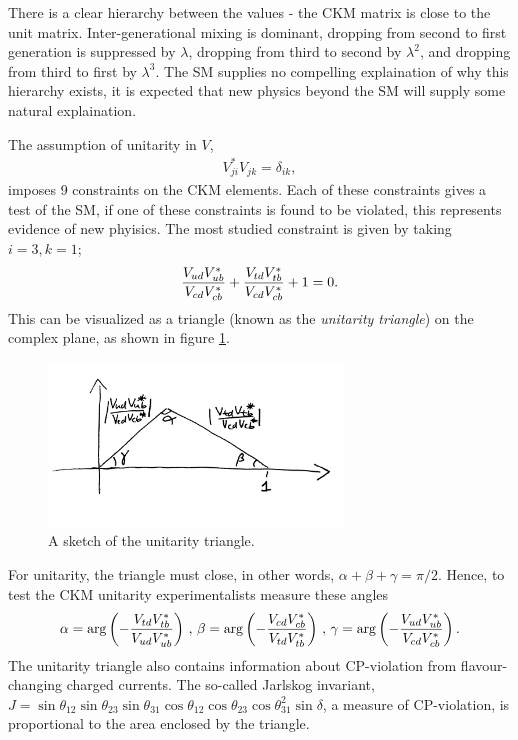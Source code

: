 There is a clear hierarchy between the values - the CKM matrix is close to the unit matrix. Inter-generational mixing is dominant, dropping from second to first generation is suppressed by $\lambda$, dropping from third to second by $\lambda^2$, and dropping from third to first by $\lambda^3$. The SM supplies no compelling explaination of why this hierarchy exists, it is expected that new physics beyond the SM will supply some natural explaination.

The assumption of unitarity in $V$,
\begin{align}
  V_{ji}^*V_{jk}=\delta_{ik},
  \label{eq:CKMunitarity}
\end{align}
imposes 9 constraints on the CKM elements. Each of these constraints gives a test of the SM, if one of these constraints is found to be violated, this represents evidence of new phyisics. The most studied constraint is given by taking $i=3,k=1$;
\begin{align}
  {V_{ud}V_{ub}^*\over V_{cd} V_{cb}^*} + {V_{td}V_{tb}^* \over V_{cd}V_{cb}^*} + 1 = 0.
\end{align}
This can be visualized as a triangle (known as the {\it{unitarity triangle}}) on the complex plane, as shown in figure \ref{fig:unitaritytriangle_sketch}.

\begin{figure}
  \vspace{-10pt}
  \begin{center}
    \includegraphics[width=0.7\textwidth]{images/unitaritytriangle_sketch.jpg}
  \end{center}
  \vspace{-25pt}
  \caption{A sketch of the unitarity triangle.}
  \label{fig:unitaritytriangle_sketch}
\end{figure}

For unitarity, the triangle must close, in other words, $\alpha+\beta+\gamma = \pi/2$. Hence, to test the CKM unitarity experimentalists measure these angles
\begin{align}
  \alpha = \arg \left( -{V_{td}V_{tb}^*\over V_{ud}V_{ub}^*}\right) \,,\,
  \beta = \arg \left( -{V_{cd}V_{cb}^*\over V_{td}V_{tb}^*} \right) \,,\,
  \gamma = \arg \left( -{V_{ud}V_{ub}^*\over V_{cd}V_{cb}^*} \right).
\end{align}
The unitarity triangle also contains information about CP-violation from flavour-changing charged currents. The so-called Jarlskog invariant, $J=\sin\theta_{12}\sin\theta_{23}\sin\theta_{31}\cos\theta_{12}\cos\theta_{23}\cos\theta_{31}^2\sin\delta$, a measure of CP-violation, is proportional to the area enclosed by the triangle.

